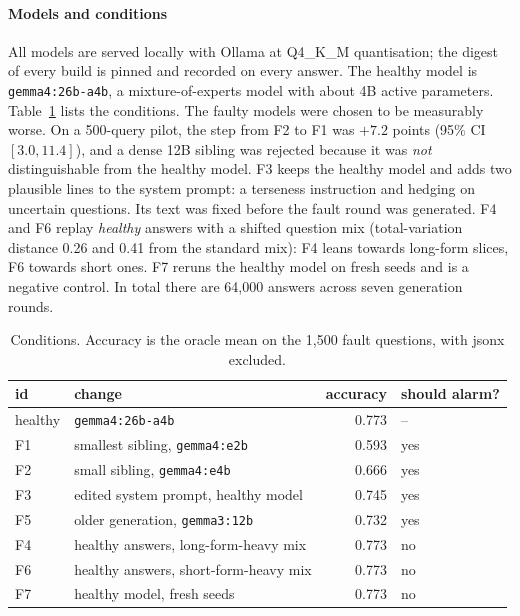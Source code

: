 \documentclass[11pt]{article}
\begin{document}
\paragraph{Models and conditions}
All models are served locally with Ollama at Q4\_K\_M quantisation; the digest of
every build is pinned and recorded on every answer. The healthy model is
\texttt{gemma4:26b-a4b}, a mixture-of-experts model with about 4B active
parameters. Table~\ref{tab:conditions} lists the conditions. The faulty models
were chosen to be measurably worse. On a 500-query pilot, the step from F2 to F1
was $+7.2$ points (95\% CI $[3.0, 11.4]$), and a dense 12B sibling was rejected
because it was \emph{not} distinguishable from the healthy model. F3 keeps the
healthy model and adds two plausible lines to the system prompt: a terseness
instruction and hedging on uncertain questions. Its text was fixed before the
fault round was generated. F4 and F6 replay \emph{healthy} answers with a shifted
question mix (total-variation distance 0.26 and 0.41 from the standard mix): F4
leans towards long-form slices, F6 towards short ones. F7 reruns the healthy
model on fresh seeds and is a negative control. In total there are 64{,}000
answers across seven generation rounds.

\begin{table}[t]
  \centering\small
  \caption{Conditions. Accuracy is the oracle mean on the 1{,}500 fault questions,
  with \textsf{jsonx} excluded.}
  \label{tab:conditions}
  \begin{tabular}{llrl}
    \toprule
    id & change & accuracy & should alarm? \\
    \midrule
    healthy & \texttt{gemma4:26b-a4b} & 0.773 & -- \\
    F1 & smallest sibling, \texttt{gemma4:e2b} & 0.593 & yes \\
    F2 & small sibling, \texttt{gemma4:e4b} & 0.666 & yes \\
    F3 & edited system prompt, healthy model & 0.745 & yes \\
    F5 & older generation, \texttt{gemma3:12b} & 0.732 & yes \\
    F4 & healthy answers, long-form-heavy mix & 0.773 & no \\
    F6 & healthy answers, short-form-heavy mix & 0.773 & no \\
    F7 & healthy model, fresh seeds & 0.773 & no \\
    \bottomrule
  \end{tabular}
\end{table}
\end{document}
